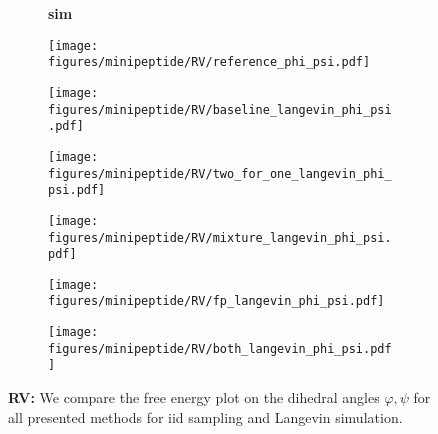 \begin{figure}
    \begin{minipage}{\textwidth}
        \begin{subfigure}[c]{0.05\textwidth}
            \vspace{-0.2cm}
            \textbf{sim}
        \end{subfigure}
        \begin{subfigure}[c]{0.15\textwidth}
            \centering
            \texttt{[image: figures/minipeptide/RV/reference\_phi\_psi.pdf]}            
        \end{subfigure}
        \begin{subfigure}[c]{0.15\textwidth}
            \centering
            \texttt{[image: figures/minipeptide/RV/baseline\_langevin\_phi\_psi.pdf]}            
        \end{subfigure}
        \begin{subfigure}[c]{0.15\textwidth}
            \centering
            \texttt{[image: figures/minipeptide/RV/two\_for\_one\_langevin\_phi\_psi.pdf]}
        \end{subfigure}
        \begin{subfigure}[c]{0.15\textwidth}
            \centering
            \texttt{[image: figures/minipeptide/RV/mixture\_langevin\_phi\_psi.pdf]}
        \end{subfigure}
        \begin{subfigure}[c]{0.15\textwidth}
            \centering
            \texttt{[image: figures/minipeptide/RV/fp\_langevin\_phi\_psi.pdf]}            
        \end{subfigure}
        \begin{subfigure}[c]{0.15\textwidth}
            \centering
            \texttt{[image: figures/minipeptide/RV/both\_langevin\_phi\_psi.pdf]}            
        \end{subfigure}
    \end{minipage}
    \caption{\textbf{RV:} We compare the free energy plot on the dihedral angles $\varphi, \psi$ for all presented methods for iid sampling and Langevin simulation.}
    \label{fig:minipeptide-rv}
\end{figure}


